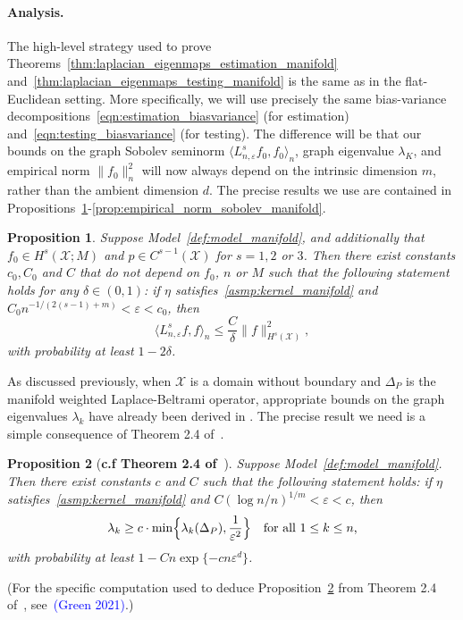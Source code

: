 \documentclass{article}
\newcommand{\1}{\mathbf{1}}
\newcommand{\mc}[1]{\mathcal{#1}}
\newcommand{\dotp}[2]{\langle #1, #2 \rangle}
\theoremstyle{alden}
\theoremstyle{aldenthm}
\newtheorem{proposition}{Proposition}
\theoremstyle{definition}
\theoremstyle{remark}
\begin{document}
\paragraph{Analysis.}
The high-level strategy used to prove Theorems~\ref{thm:laplacian_eigenmaps_estimation_manifold} and~\ref{thm:laplacian_eigenmaps_testing_manifold} is the same as in the flat-Euclidean setting. More specifically, we will use precisely the same bias-variance decompositions~\eqref{eqn:estimation_biasvariance} (for estimation) and~\eqref{eqn:testing_biasvariance} (for testing). The difference will be that our bounds on the graph Sobolev seminorm $\dotp{L_{n,\varepsilon}^sf_0}{f_0}_n$, graph eigenvalue $\lambda_K$, and empirical norm $\|f_0\|_n^2$ will now always depend on the intrinsic dimension $m$, rather than the ambient dimension $d$. The precise results we use are contained in Propositions~\ref{prop:graph_seminorm_manifold}-\ref{prop:empirical_norm_sobolev_manifold}.
\begin{proposition}
	\label{prop:graph_seminorm_manifold} 
	Suppose Model~\ref{def:model_manifold}, and additionally that $f_0 \in H^s(\mc{X};M)$ and $p \in C^{s - 1}(\mc{X})$ for $s = 1,2$ or $3$. Then there exist constants $c_0,C_0$ and $C$ that do not depend on $f_0$, $n$ or $M$ such that the following statement holds for any $\delta \in (0,1)$: if $\eta$ satisfies~\ref{asmp:kernel_manifold} and $C_0n^{-1/(2(s - 1) + m)} < \varepsilon < c_0$, then
	\begin{equation}
	\label{eqn:graph_seminorm_manifold}
	\dotp{L_{n,\varepsilon}^s f}{f}_n \leq \frac{C}{\delta} \|f\|_{H^s(\mc{X})}^2,
	\end{equation}
	with probability at least $1 - 2\delta$.
\end{proposition}

As discussed previously, when $\mc{X}$ is a domain without boundary and $\Delta_P$ is the manifold weighted Laplace-Beltrami operator, appropriate bounds on the graph eigenvalues $\lambda_k$ have already been derived in \citep{burago2014,trillos2019,garciatrillos19}. The precise result we need is a simple consequence of Theorem 2.4 of~\citep{calder2019}.
\begin{proposition}[\textbf{c.f Theorem 2.4 of~\citep{calder2019}}]
	\label{prop:graph_eigenvalue_manifold}
	Suppose Model~\ref{def:model_manifold}. Then there exist constants $c$ and $C$ such that the following statement holds: if $\eta$ satisfies~\ref{asmp:kernel_manifold} and $C(\log n/n)^{1/m} < \varepsilon < c$, then
	\begin{equation}
	\label{eqn:graph_eigenvalue_manifold}
	\lambda_k \geq c \cdot \min\Bigl\{\lambda_k(\Delta_P), \frac{1}{\varepsilon^{2}} \Bigr\} \quad \textrm{for all $1 \leq k \leq n$,}
	\end{equation}
	with probability at least $1 - Cn\exp\{-c n\varepsilon^d\}$. 
\end{proposition}
(For the specific computation used to deduce Proposition~\ref{prop:graph_eigenvalue_manifold} from Theorem 2.4 of~\citep{calder2019}, see~\textcolor{blue}{(Green 2021)}.)
\end{document}
